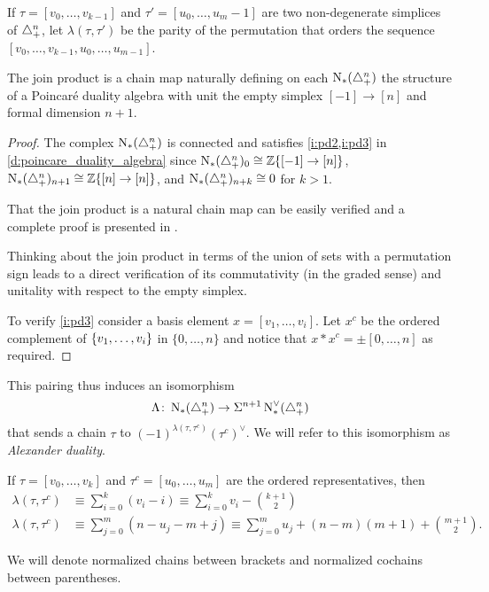 \begin{notation}
	If $\tau = [v_0,\ldots,v_{k-1}]$ and $\tau'=[u_0,\ldots,u_{m}-1]$ are two non-degenerate simplices of $\triangle_{+}^n$, let $\lambda(\tau,\tau')$ be the parity of the permutation that orders the sequence $[v_0,\ldots,v_{k-1},u_0,\ldots,u_{m-1}]$.
\end{notation}

\begin{theorem}
	The join product is a chain map naturally defining on each $\operatorname{N}_{*}(\triangle_{+}^{n})$ the structure of a Poincar\'e duality algebra with unit the empty simplex $[-1] \to [n]$ and formal dimension $n+1$.
\end{theorem}


\begin{proof}
	The complex $\operatorname{N}_{*}(\triangle_{+}^{n})$ is connected and satisfies \cref{i:pd2,i:pd3} in \cref{d:poincare_duality_algebra} since $\operatorname{N}_{*}(\triangle_{+}^{n})_0 \cong \mathbb{Z}\{[-1] \to [n]\}$, $\operatorname{N}_{*}(\triangle_{+}^{n})_{n+1} \cong \mathbb{Z}\{[n] \to [n]\}$, and $\operatorname{N}_{*}(\triangle_{+}^{n})_{n+k} \cong 0$ for $k>1$.

	That the join product is a natural chain map can be easily verified and a complete proof is presented in \cite[p.19]{medina2020prop1}.

	Thinking about the join product in terms of the union of sets with a permutation sign leads to a direct verification of its commutativity (in the graded sense) and unitality with respect to the empty simplex.

	To verify \cref{i:pd3} consider a basis element $x = [v_1,\dots,v_i]$.
	Let $x^c$ be the ordered complement of $\{v_1,\dots,v_i\}$ in $\{0,\dots,n\}$ and notice that $x \ast x^c = \pm [0,\dots,n]$ as required.
\end{proof}
This pairing thus induces an isomorphism
\begin{equation}\label{eq:iso1}
	\Lambda \colon  \operatorname{N}_{*}(\triangle_{+}^n)\to \Sigma^{n+1}\operatorname{N}^\vee_{*}(\triangle_{+}^n)
\end{equation}
 that sends a chain $\tau$ to $(-1)^{\lambda(\tau,\tau^c)}(\tau^c)^\vee$. We will refer to this isomorphism as \emph{Alexander duality}.

\begin{remark}\label{remark:alex}
 If $\tau = [v_0,\ldots,v_k]$ and $\tau^c  = [u_0,\ldots,u_m]$ are the ordered representatives, then
    \begin{align*}
        \lambda(\tau,\tau^c)&\equiv \sum_{i=0}^k (v_i-i) \equiv \sum_{i=0}^k v_i - \binom{k+1}{2} \\
        \lambda(\tau,\tau^c)&\equiv \sum_{j=0}^m (n-u_j-m+j) \equiv \sum_{j=0}^m u_j +(n-m)(m+1)+\binom{m+1}{2}.
    \end{align*}
\end{remark}

\begin{notation} We will denote normalized chains between brackets and normalized cochains between parentheses.
\end{notation}
